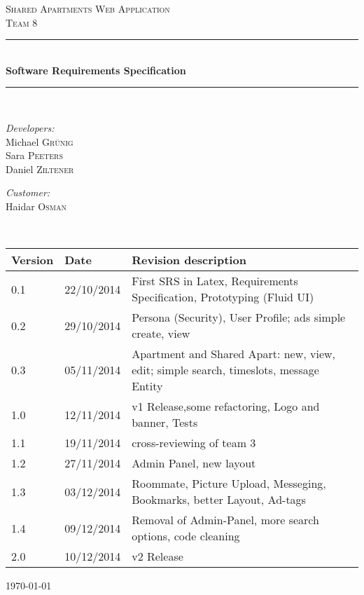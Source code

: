 \begin{titlepage}
\begin{center}



\textsc{\LARGE Shared Apartments Web Application}\\[1.0cm]
\textsc{\Large Team 8}\\[1.5cm]
\newcommand{\HRule}{\rule{\linewidth}{0.5mm}}
\HRule \\[0.4cm]
{ \huge \bfseries Software Requirements Specification}\\[0.4cm]

\HRule \\[1.5cm]

\begin{minipage}{0.4\textwidth}
\begin{flushleft} \large
\emph{Developers:}\\
Michael \textsc{Gr\"unig}\\
Sara \textsc{Peeters}\\
Daniel \textsc{Ziltener}
\end{flushleft}
\end{minipage}
\hfill
\begin{minipage}{0.4\textwidth}
\begin{flushright} \large
\emph{Customer:} \\
Haidar \textsc{Osman}
\end{flushright}
\end{minipage}
\\[1.5cm]
\begin{tabular}{|l|l|l|}
\hline
\textbf{Version}&\textbf{Date}&\textbf{Revision description}\\ \hline
0.1 & 22/10/2014 & First SRS in Latex, Requirements Specification, Prototyping (Fluid UI) \\ \hline
0.2 & 29/10/2014 & Persona (Security), User Profile; ads simple create, view  \\ \hline
0.3 & 05/11/2014 & Apartment and Shared Apart: new, view, edit; simple search, timeslots, message Entity\\ \hline
1.0 & 12/11/2014 & v1 Release,some refactoring, Logo and banner, Tests\\ \hline

1.1 & 19/11/2014 & cross-reviewing of team 3\\ \hline

1.2 & 27/11/2014 & Admin Panel, new layout\\ \hline
1.3 & 03/12/2014 & Roommate, Picture Upload, Messeging, Bookmarks, better Layout, Ad-tags  \\ \hline

1.4 & 09/12/2014 & Removal of Admin-Panel, more search options, code cleaning  \\ \hline
2.0 & 10/12/2014 &  v2 Release \\ \hline
\end{tabular}

\vfill

{\large \today}

\end{center}

\end{titlepage}
